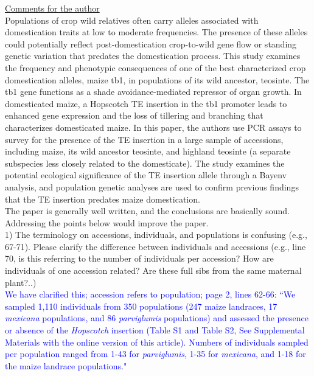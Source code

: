 \documentclass[11pt]{article}
\newcommand{\res}[1]{\noindent \textcolor{blue}{{#1}} \\}
\begin{document}
\underline{Comments for the author}\\

Populations of crop wild relatives often carry alleles associated with domestication traits at low to moderate frequencies. The presence of these alleles could potentially reflect post-domestication crop-to-wild gene flow or standing genetic variation that predates the domestication process. This study examines the frequency and phenotypic consequences of one of the best characterized crop domestication alleles, maize tb1, in populations of its wild ancestor, teosinte. The tb1 gene functions as a shade avoidance-mediated repressor of organ growth. In domesticated maize, a Hopscotch TE insertion in the tb1 promoter leads to enhanced gene expression and the loss of tillering and branching that characterizes domesticated maize. In this paper, the authors use PCR assays to survey for the presence of the TE insertion in a large sample of accessions, including maize, its wild ancestor teosinte, and highland teosinte (a separate subspecies less closely related to the domesticate). The study examines the potential ecological significance of the TE insertion allele through a Bayenv analysis, and population genetic analyses are used to confirm previous findings that the TE insertion predates maize domestication.\\ 

The paper is generally well written, and the conclusions are basically sound. Addressing the points below would improve the paper. \\

1) The terminology on accessions, individuals, and populations is confusing (e.g., 67-71). Please clarify the difference between individuals and accessions (e.g., line 70‚ is this referring to the number of individuals per accession? How are individuals of one accession related? Are these full sibs from the same maternal plant?..) \\

\res{We have clarified this; accession refers to population; page 2, lines 62-66: ``We sampled 1,110 individuals from 350 populations (247 maize landraces, 17 \emph{mexicana} populations, and 86 \emph{parviglumis} populations) and assessed the presence or absence of the \emph{Hopscotch} insertion (Table S1 and Table S2, See Supplemental Materials with the online version of this article). Numbers of individuals sampled per population ranged from 1-43 for \emph{parviglumis}, 1-35 for \emph{mexicana}, and 1-18 for the maize landrace populations."}
\end{document}
